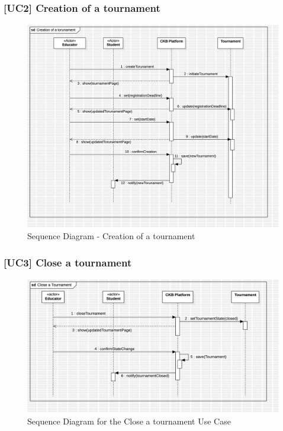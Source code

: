 \subsubsection*{[UC2] Creation of a tournament}
\begin{figure}[H]
    \centering
    \includegraphics[width=\textwidth]{Diagrams/TournamentCreationSD.jpg}
    \caption{Sequence Diagram - Creation of a tournament}
    \label{fig:sequence-diagram-create-tournament}
\end{figure}

\subsubsection*{[UC3] Close a tournament}
\begin{figure}[H]
    \centering
    \includegraphics[width=\textwidth]{Diagrams/UC3SequenceDiagram.jpg}
    \caption{Sequence Diagram for the Close a tournament Use Case}
    \label{fig:sequence-diagram-close-tournament}
\end{figure}

